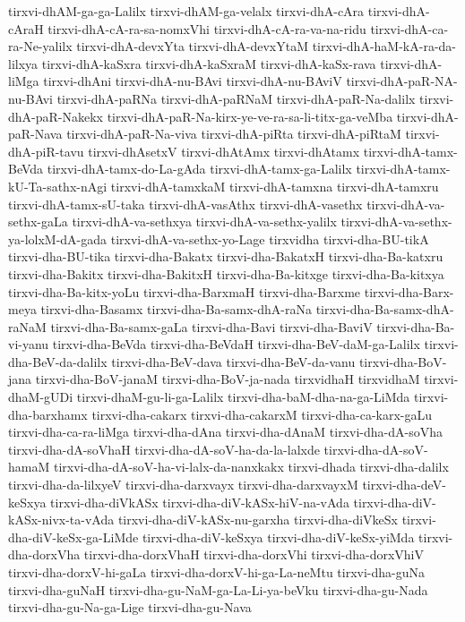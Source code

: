 {tirxvi-dhAM-ga-ga-Lalilx
tirxvi-dhAM-ga-velalx
tirxvi-dhA-cAra
tirxvi-dhA-cAraH
tirxvi-dhA-cA-ra-sa-nomxVhi
tirxvi-dhA-cA-ra-va-na-ridu
tirxvi-dhA-ca-ra-Ne-yalilx
tirxvi-dhA-devxYta
tirxvi-dhA-devxYtaM
tirxvi-dhA-haM-kA-ra-da-lilxya
tirxvi-dhA-kaSxra
tirxvi-dhA-kaSxraM
tirxvi-dhA-kaSx-rava
tirxvi-dhA-liMga
tirxvi-dhAni
tirxvi-dhA-nu-BAvi
tirxvi-dhA-nu-BAviV
tirxvi-dhA-paR-NA-nu-BAvi
tirxvi-dhA-paRNa
tirxvi-dhA-paRNaM
tirxvi-dhA-paR-Na-dalilx
tirxvi-dhA-paR-Nakekx
tirxvi-dhA-paR-Na-kirx-ye-ve-ra-sa-li-titx-ga-veMba
tirxvi-dhA-paR-Nava
tirxvi-dhA-paR-Na-viva
tirxvi-dhA-piRta
tirxvi-dhA-piRtaM
tirxvi-dhA-piR-tavu
tirxvi-dhAsetxV
tirxvi-dhAtAmx
tirxvi-dhAtamx
tirxvi-dhA-tamx-BeVda
tirxvi-dhA-tamx-do-La-gAda
tirxvi-dhA-tamx-ga-Lalilx
tirxvi-dhA-tamx-kU-Ta-sathx-nAgi
tirxvi-dhA-tamxkaM
tirxvi-dhA-tamxna
tirxvi-dhA-tamxru
tirxvi-dhA-tamx-sU-taka
tirxvi-dhA-vasAthx
tirxvi-dhA-vasethx
tirxvi-dhA-va-sethx-gaLa
tirxvi-dhA-va-sethxya
tirxvi-dhA-va-sethx-yalilx
tirxvi-dhA-va-sethx-ya-lolxM-dA-gada
tirxvi-dhA-va-sethx-yo-Lage
tirxvidha
tirxvi-dha-BU-tikA
tirxvi-dha-BU-tika
tirxvi-dha-Bakatx
tirxvi-dha-BakatxH
tirxvi-dha-Ba-katxru
tirxvi-dha-Bakitx
tirxvi-dha-BakitxH
tirxvi-dha-Ba-kitxge
tirxvi-dha-Ba-kitxya
tirxvi-dha-Ba-kitx-yoLu
tirxvi-dha-BarxmaH
tirxvi-dha-Barxme
tirxvi-dha-Barx-meya
tirxvi-dha-Basamx
tirxvi-dha-Ba-samx-dhA-raNa
tirxvi-dha-Ba-samx-dhA-raNaM
tirxvi-dha-Ba-samx-gaLa
tirxvi-dha-Bavi
tirxvi-dha-BaviV
tirxvi-dha-Ba-vi-yanu
tirxvi-dha-BeVda
tirxvi-dha-BeVdaH
tirxvi-dha-BeV-daM-ga-Lalilx
tirxvi-dha-BeV-da-dalilx
tirxvi-dha-BeV-dava
tirxvi-dha-BeV-da-vanu
tirxvi-dha-BoV-jana
tirxvi-dha-BoV-janaM
tirxvi-dha-BoV-ja-nada
tirxvidhaH
tirxvidhaM
tirxvi-dhaM-gUDi
tirxvi-dhaM-gu-li-ga-Lalilx
tirxvi-dha-baM-dha-na-ga-LiMda
tirxvi-dha-barxhamx
tirxvi-dha-cakarx
tirxvi-dha-cakarxM
tirxvi-dha-ca-karx-gaLu
tirxvi-dha-ca-ra-liMga
tirxvi-dha-dAna
tirxvi-dha-dAnaM
tirxvi-dha-dA-soVha
tirxvi-dha-dA-soVhaH
tirxvi-dha-dA-soV-ha-da-la-lalxde
tirxvi-dha-dA-soV-hamaM
tirxvi-dha-dA-soV-ha-vi-lalx-da-nanxkakx
tirxvi-dhada
tirxvi-dha-dalilx
tirxvi-dha-da-lilxyeV
tirxvi-dha-darxvayx
tirxvi-dha-darxvayxM
tirxvi-dha-deV-keSxya
tirxvi-dha-diVkASx
tirxvi-dha-diV-kASx-hiV-na-vAda
tirxvi-dha-diV-kASx-nivx-ta-vAda
tirxvi-dha-diV-kASx-nu-garxha
tirxvi-dha-diVkeSx
tirxvi-dha-diV-keSx-ga-LiMde
tirxvi-dha-diV-keSxya
tirxvi-dha-diV-keSx-yiMda
tirxvi-dha-dorxVha
tirxvi-dha-dorxVhaH
tirxvi-dha-dorxVhi
tirxvi-dha-dorxVhiV
tirxvi-dha-dorxV-hi-gaLa
tirxvi-dha-dorxV-hi-ga-La-neMtu
tirxvi-dha-guNa
tirxvi-dha-guNaH
tirxvi-dha-gu-NaM-ga-La-Li-ya-beVku
tirxvi-dha-gu-Nada
tirxvi-dha-gu-Na-ga-Lige
tirxvi-dha-gu-Nava
}
